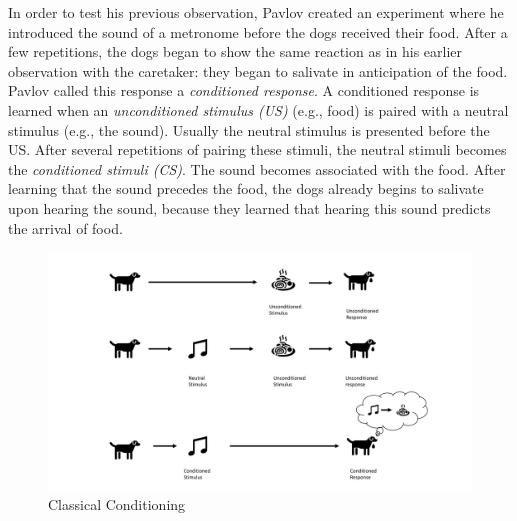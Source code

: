 In order to test his previous observation, Pavlov created an experiment where he introduced the sound of a metronome before the dogs received their food. %
After a few repetitions, the dogs began to show the same reaction as in his earlier observation with the caretaker: they began to salivate in anticipation of the food.
Pavlov called this response a \emph{conditioned response}. A conditioned response is learned when an \emph{unconditioned stimulus (US)} (e.g., food) is paired with a neutral stimulus (e.g., the sound). Usually the neutral stimulus is presented before the US. After several repetitions of pairing these stimuli, the neutral stimuli becomes the \emph{conditioned stimuli (CS)}. The sound becomes associated with the food. After learning that the sound precedes the food, the dogs already begins to salivate upon hearing the sound, because they learned that hearing this sound predicts the arrival of food. %

\begin{figure}
    \centering
    \includegraphics[width=1\textwidth]{Plots/ClassicalConditioning.pdf}
    \caption{Classical Conditioning}
    \label{fig:Classical_Conditioning}
\end{figure}


